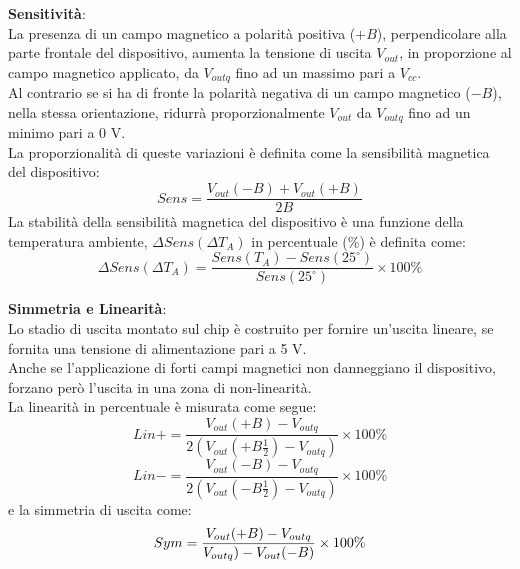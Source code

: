 \newpage{}

\textbf{Sensitività}:\\ 
La presenza di un campo magnetico a polarità positiva ($+{B}$), perpendicolare alla parte frontale del dispositivo, aumenta la tensione di uscita $V_{out}$, in proporzione al campo magnetico applicato, da $V_{outq}$ fino ad un massimo pari a $V_{cc}$.\\
Al contrario se si ha di fronte la polarità negativa di un campo magnetico ($-{B}$), nella stessa orientazione, ridurrà proporzionalmente $V_{out}$ da  $V_{outq}$ fino ad un minimo pari a 0 V.\\
La proporzionalità di queste variazioni è definita come la sensibilità magnetica del dispositivo:
\begin{equation} \label{eqn-1.10}
	Sens = \frac{V_{out}(-B) + V_{out}(+B)}{2B}
\end{equation}
La stabilità della sensibilità magnetica del dispositivo è una funzione della temperatura ambiente, $\Delta{}Sens(\Delta{}T_A)$ in percentuale (\%) è definita come:
\begin{equation} \label{eqn-1.10}
	\Delta{}Sens(\Delta{}T_A) = \frac{Sens(T_A) - Sens(25^{\circ{}})}{Sens(25^{\circ{}})} \times{} 100\%
\end{equation}

\textbf{Simmetria e Linearità}:\\
Lo stadio di uscita montato sul chip è costruito per fornire un'uscita lineare, se fornita una tensione di alimentazione pari a 5 V.\\
Anche se l'applicazione di forti campi magnetici non danneggiano il dispositivo, forzano però l'uscita in una zona di non-linearità.\\
La linearità in percentuale è misurata come segue:
\begin{equation} \label{eqn-1.10}
	Lin+ = \frac{V_{out}(+B) - V_{outq}}{2(V_{out}(+B\frac{1}{2}) - V_{outq})} \times{} 100\%
\end{equation}
\begin{equation} \label{eqn-1.10}
	Lin- = \frac{V_{out}(-B) - V_{outq}}{2(V_{out}(-B\frac{1}{2}) - V_{outq})} \times{} 100\%
\end{equation}
e la simmetria di uscita come:
\begin{equation} \label{eqn-1.10}
	Sym = \frac{V_{out}(+B) - V_{outq}}{V_{outq}) - V_{out}(-B)} \times{} 100\%\\[4mm]
\end{equation}

